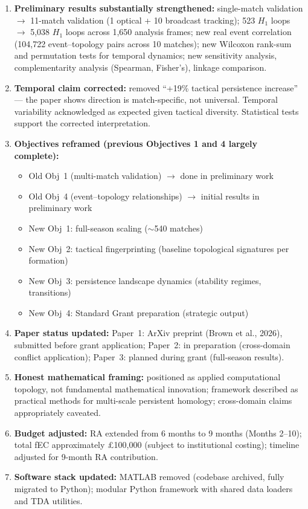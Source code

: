 \begin{enumerate}[label=\arabic*.]
  \item \textbf{Preliminary results substantially strengthened:} single-match validation $\rightarrow$ 11-match validation (1 optical + 10 broadcast tracking); 523 $H_1$ loops $\rightarrow$ 5{,}038 $H_1$ loops across 1{,}650 analysis frames; new real event correlation (104{,}722 event--topology pairs across 10 matches); new Wilcoxon rank-sum and permutation tests for temporal dynamics; new sensitivity analysis, complementarity analysis (Spearman, Fisher's), linkage comparison.

  \item \textbf{Temporal claim corrected:} removed ``+19\% tactical persistence increase'' --- the paper shows direction is match-specific, not universal. Temporal variability acknowledged as expected given tactical diversity. Statistical tests support the corrected interpretation.

  \item \textbf{Objectives reframed (previous Objectives 1 and 4 largely complete):}
    \begin{itemize}
      \item Old Obj~1 (multi-match validation) $\rightarrow$ done in preliminary work
      \item Old Obj~4 (event--topology relationships) $\rightarrow$ initial results in preliminary work
      \item New Obj~1: full-season scaling ($\sim$540 matches)
      \item New Obj~2: tactical fingerprinting (baseline topological signatures per formation)
      \item New Obj~3: persistence landscape dynamics (stability regimes, transitions)
      \item New Obj~4: Standard Grant preparation (strategic output)
    \end{itemize}

  \item \textbf{Paper status updated:} Paper~1: ArXiv preprint (Brown et al., 2026), submitted before grant application; Paper~2: in preparation (cross-domain conflict application); Paper~3: planned during grant (full-season results).

  \item \textbf{Honest mathematical framing:} positioned as applied computational topology, not fundamental mathematical innovation; framework described as practical methods for multi-scale persistent homology; cross-domain claims appropriately caveated.

  \item \textbf{Budget adjusted:} RA extended from 6 months to 9 months (Months 2--10); total fEC approximately \pounds100{,}000 (subject to institutional costing); timeline adjusted for 9-month RA contribution.

  \item \textbf{Software stack updated:} MATLAB removed (codebase archived, fully migrated to Python); modular Python framework with shared data loaders and TDA utilities.
\end{enumerate}

